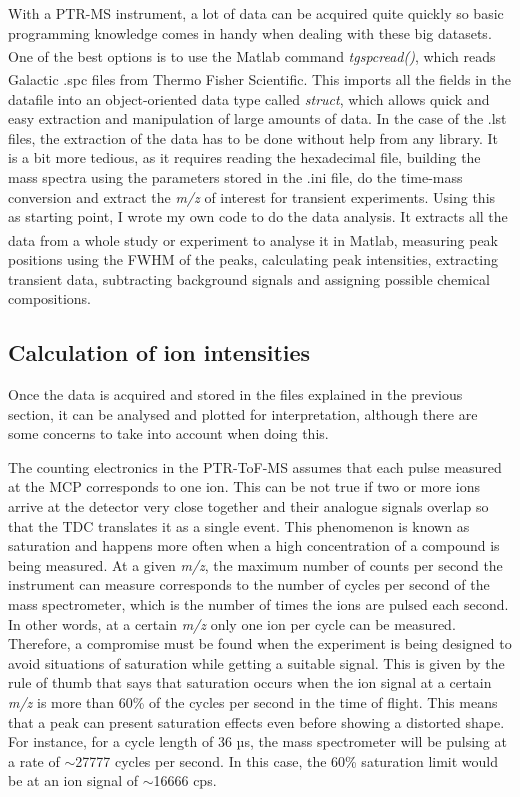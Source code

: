  With a PTR-MS instrument, a lot of data can be acquired quite quickly so basic programming knowledge comes in handy when dealing with these big datasets.
 One of the best options is to use the Matlab\textsuperscript{\textregistered} command \textit{tgspcread()}, which reads  Galactic .spc files from Thermo Fisher Scientific\textsuperscript{\textregistered}. This imports all the fields in the datafile into an object-oriented data type called \textit{struct}, which allows quick and easy extraction and manipulation of large amounts of data.
 In the case of the .lst files, the extraction of the data has to be done without help from any library. It is a bit more tedious, as it requires reading the hexadecimal file, building the mass spectra using the parameters stored in the .ini file, do the time-mass conversion and  extract the \textit{m/z} of interest for transient experiments.
 Using this  as starting point, I wrote my own code to do the data analysis. It extracts all the data from a whole study or experiment to analyse it in Matlab\textsuperscript{\textregistered}, measuring peak positions using the FWHM of the peaks, calculating peak intensities, extracting transient data, subtracting background signals and assigning possible chemical compositions.




\subsection{Calculation of ion intensities}
Once the data is acquired and stored in the files explained in the previous section, it can be analysed and plotted for interpretation, although there are some concerns to %
take into account when doing this.

The counting electronics in the PTR-ToF-MS assumes that each pulse measured at the MCP corresponds to one ion. This can be not true if two or more ions arrive at the detector very close together and their analogue signals overlap so that the TDC translates it as a single event. This phenomenon is known as saturation and happens more often when a high concentration of a compound is being measured.
At a given \textit{m/z}, the maximum number of counts per second the instrument can measure corresponds to the number of cycles per second of the mass spectrometer, which is the number of times the ions are pulsed each second. In other words, at a certain \textit{m/z} only one ion per cycle can be measured. Therefore, a compromise must be found when the experiment is being designed to avoid situations of saturation while getting a suitable signal.
This is given by the rule of thumb that says that saturation occurs when the ion signal at a certain \textit{m/z} is more than 60\% of the cycles per second in the time of flight.
This means that a peak can present saturation effects even before showing a distorted shape. For instance, for a cycle length of 36 µs, the mass spectrometer will be pulsing at a rate of $\sim$27777 cycles per second.
In this case, the 60\% saturation limit would be at an ion signal of $\sim$16666 cps.

